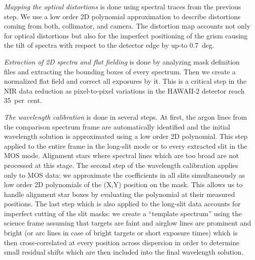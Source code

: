  \emph{Mapping the optical distortions} is done using spectral traces from the previous step.  We use a low order 2D polynomial approximation to describe distortions coming from both, collimator, and camera. The distortion map accounts not only for optical distortions but also for the imperfect positioning of the grism causing the tilt of spectra with respect to the detector edge by up-to 0.7~deg.

 \emph{Extraction of 2D spectra and flat fielding} is done by analyzing mask definition files and extracting the bounding boxes of every spectrum.  Then we create a normalized flat field and correct all exposures by it.  This is a critical step in the NIR data reduction as pixel-to-pixel variations in the HAWAII-2 detector reach 35~per~cent.

 \emph{The wavelength calibration} is done in several steps. At first, the argon lines from the comparison spectrum frame are automatically identified and the initial wavelength solution is approximated using a low order 2D polynomial.  This step applied to the entire frame in the long-slit mode or to every extracted slit in the MOS mode.  Alignment stars where spectral lines which are too broad are not processed at this stage.  The second step of the wavelength calibration applies only to MOS data: we approximate the coefficients in all slits simultaneously as low order 2D polynomials of the (X,Y) position on the mask.  This allows us to handle alignment star boxes by evaluating the polynomial at their measured positions.  The last step which is also applied to the long-slit data accounts for imperfect cutting of the slit masks: we create a ``template spectrum'' using the science frame assuming that targets are faint and airglow lines are prominent and bright (or arc lines in case of bright targets or short exposure times) which is then cross-correlated at every position across dispersion in order to determine small residual shifts which are then included into the final wavelength solution.

